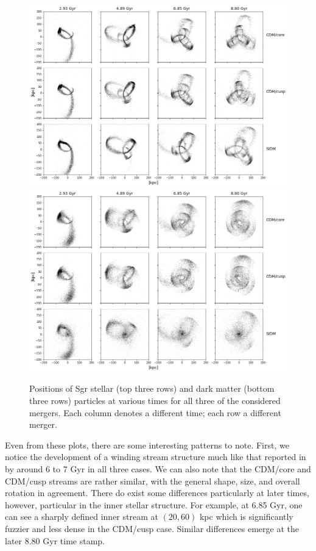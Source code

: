 \begin{figure}
    \centering
    \includegraphics[width=0.9\linewidth]{figs/stars_bw.png}
    \includegraphics[width=0.9\linewidth]{figs/darks_bw.png}
    \caption{%
        Positions of Sgr stellar (top three rows) and dark matter (bottom
        three rows) particles at various times for all three of the considered
        mergers.  Each column denotes a different time; each row a different
        merger.
    }
    \label{fig:inits}
\end{figure}

Even from these plots, there are some interesting patterns to note. First, we
notice the development of a winding stream structure much like that reported
in~\cite{dierickx_predicted_2017} by around 6 to 7 Gyr in all three cases. We
can also note that the CDM/core and CDM/cusp streams are rather similar, with
the general shape, size, and overall rotation in agreement. There do exist some
differences particularly at later times, however, particular in the inner
stellar structure. For example, at 6.85 Gyr, one can see a sharply defined inner
stream at $(20,60)$ kpc which is significantly fuzzier and less dense in the
CDM/cusp case. Similar differences emerge at the later 8.80 Gyr time stamp.

